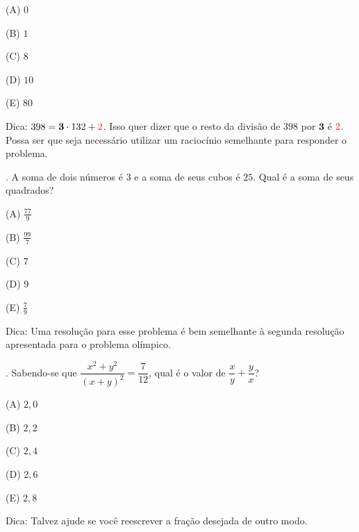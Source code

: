\documentclass[a4paper, 12pt]{article}
\begin{document}
\begin{flushleft}

(A)	\(0\)

(B)	\(1\)

(C)	\(8\)

(D)	\(10\)

(E)	\(80\) 

\end{flushleft}

\noindent Dica: \(398 = \textbf{3}\cdot{132} + \textcolor{red}{2}\). Isso quer dizer que o resto da divisão de \(398\) por \(\textbf{3}\) é \(\textcolor{red}{2}\). Possa ser que seja necessário utilizar um raciocínio semelhante para responder o problema. 


{}. A soma de dois números é \(3\) e a soma de seus cubos é \(25\). Qual é a soma de seus quadrados?

\begin{flushleft}

(A)	\(\frac{77}{9}\)

(B)	\(\frac{99}{7}\)	

(C)	\(7\)

(D)	\(9\)

(E)	\(\frac{7}{9}\) 

\end{flushleft}

\noindent Dica: Uma resolução para esse problema é bem semelhante à segunda resolução apresentada para o problema olímpico. 

%

{}. Sabendo-se que \(\dfrac{x^2 + y^2}{(x + y)^2} = \dfrac{7}{12}\), qual é o valor de \(\dfrac{x}{y} + \dfrac{y}{x}\)?

\begin{flushleft}

(A)	\(2,0\)

(B)	\(2,2\)

(C)	\(2,4\)

(D)	\(2,6\)

(E)	\(2,8\) 

\end{flushleft}

\noindent Dica: Talvez ajude se você reescrever a fração desejada de outro modo. \\ \\ 
\end{document}
